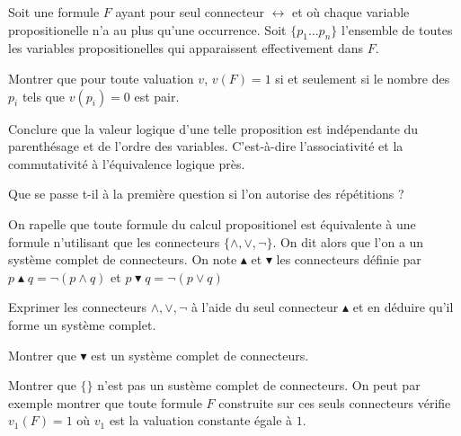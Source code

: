 \documentclass[french]{report}
\begin{document}
\begin{exo}
    Soit une formule \(F\) ayant pour seul connecteur \(\leftrightarrow\) et où
    chaque variable propositionelle n'a au plus qu'une occurrence. Soit
    \(\{p_1\dots p_n\}\) l'ensemble de toutes les variables propositionelles qui
    apparaissent effectivement dans \(F\).
    \begin{q}{1}
        Montrer que pour toute valuation \(v\), \(v(F)=1\) si et seulement si
        le nombre des \(p_i\) tels que \(v(p_i)=0\) est pair.
    \end{q}
    \begin{q}{2}
        Conclure que la valeur logique d'une telle proposition est indépendante
        du parenthésage et de l'ordre des variables. C'est-à-dire l'associativité
        et la commutativité à l'équivalence logique près.
    \end{q}
    \begin{q}{3}
        Que se passe t-il à la première question si l'on autorise des répétitions ?
    \end{q}
\end{exo}

\begin{exo}
    On rapelle que toute formule du calcul propositionel est équivalente à une formule
    n'utilisant que les connecteurs \(\{\land,\lor,\lnot\}\). On dit alors que l'on a
    un système complet de connecteurs. On note \(\blacktriangle\) et \(\blacktriangledown\)
    les connecteurs définie par \(p\blacktriangle q=\lnot(p\land q)\) et
    \(p\blacktriangledown q=\lnot(p\lor q)\)
    \begin{q}{1}
        Exprimer les connecteurs \(\land, \lor, \lnot\) à l'aide du seul connecteur
        \(\blacktriangle\) et en déduire qu'il forme un système complet.
    \end{q}
    \begin{q}{2}
        Montrer que \(\blacktriangledown\) est un système complet de connecteurs.
    \end{q}
\end{exo}

\begin{exo}
    Montrer que \(\{\}\) n'est pas un sustème complet de connecteurs. On peut
    par exemple montrer que toute formule \(F\) construite sur ces seuls connecteurs
    vérifie \(v_1(F)=1\) où \(v_1\) est la valuation constante égale à \(1\).
\end{exo}
\end{document}
